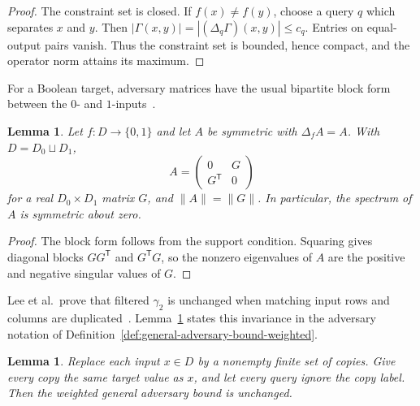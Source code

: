 \documentclass[11pt]{article}
\numberwithin{equation}{section}
\newtheorem{lemma}[definition]{Lemma}
\theoremstyle{remark}
\begin{document}
\begin{proof}
The constraint set is closed.  If $f(x)\neq f(y)$, choose a query $q$ which
separates $x$ and $y$.  Then
$|\Gamma(x,y)|=|(\Delta_q\Gamma)(x,y)|\leq c_q$.  Entries on equal-output
pairs vanish.  Thus the constraint set is bounded, hence compact, and the
operator norm attains its maximum.
\end{proof}

For a Boolean target, adversary matrices have the usual bipartite block form
between the $0$- and $1$-inputs~\cite{HoyerLeeSpalek2007}.

\begin{lemma}
\label{lem:bipartite-spectrum}
Let $f:D\to\{0,1\}$ and let $A$ be symmetric with
$\Delta_fA=A$.  With $D=D_0\sqcup D_1$,
\begin{equation}
    A=
    \begin{pmatrix}
        0&G\\
        G^{\mathsf T}&0
    \end{pmatrix}
\end{equation}
for a real $D_0\times D_1$ matrix $G$, and $\|A\|=\|G\|$.  In
particular, the spectrum of $A$ is symmetric about zero.
\end{lemma}

\begin{proof}
The block form follows from the support condition.  Squaring gives diagonal
blocks $GG^{\mathsf T}$ and $G^{\mathsf T}G$, so the nonzero eigenvalues of
$A$ are the positive and negative singular values of $G$.
\end{proof}

Lee et al.\ prove that filtered $\gamma_2$ is unchanged when matching input
rows and columns are duplicated~\cite[Lemma~A.2(5)]{LeeMittalReichardtSpalekSzegedy2011}.
Lemma~\ref{lem:adversary-copy-invariance} states this invariance in the
adversary notation of Definition~\ref{def:general-adversary-bound-weighted}.

\begin{lemma}
\label{lem:adversary-copy-invariance}
Replace each input $x\in D$ by a nonempty finite set of copies.  Give every
copy the same target value as $x$, and let every query ignore the copy
label.  Then the weighted general adversary bound is unchanged.
\end{lemma}
\end{document}

